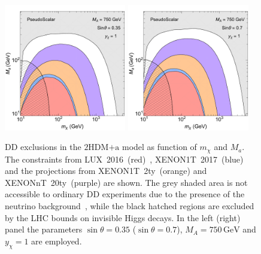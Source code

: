 \documentclass[review]{elsarticle}
\newcommand{\hdma}{\ensuremath{\textrm{2HDM+a}}\xspace}
\begin{document}
\begin{figure}[t!]
\begin{center}
\includegraphics[width=0.475\textwidth]{PseudoS035.pdf} \quad 
\includegraphics[width=0.475\textwidth]{PseudoS07.pdf}
\vspace{4mm}
\caption{DD exclusions in the \hdma model as function of $m_\chi$ and $M_a$.  The constraints from LUX~2016~(red)~\cite{Akerib:2016vxi}, XENON1T~2017~(blue)~\cite{Aprile:2017iyp} and the projections from XENON1T~2ty~(orange) and  XENONnT~20ty~(purple) \cite{Aprile:2015uzo} are shown. The grey shaded area is not accessible to ordinary DD experiments due to the presence of the neutrino background~\cite{Billard:2013qya}, while the   black hatched regions are excluded by the LHC bounds on invisible Higgs decays. In the left (right) panel the parameters $\sin \theta = 0.35$ ($\sin \theta = 0.7$), $M_A = 750 \, {\mathrm{GeV}}$ and $y_\chi = 1$ are employed.} 
\label{fig:PSDD}
\end{center}
\end{figure} 
\end{document}
